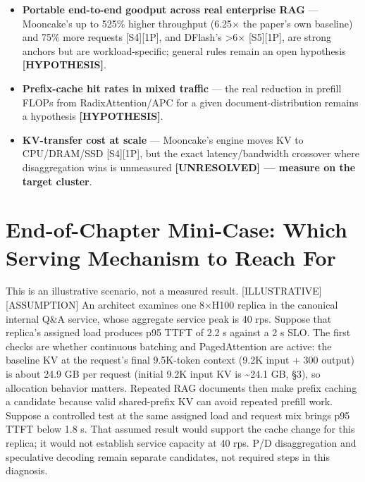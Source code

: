 \begin{itemize}
\tightlist
\item
  \textbf{Portable end-to-end goodput across real enterprise RAG} ---
  Mooncake's up to 525\% higher throughput (6.25× the paper's own
  baseline) and 75\% more requests \mbox{{[}S4{]}}\hspace{0pt}\mbox{{[}1P{]}}, and DFlash's
  \textgreater6× \mbox{{[}S5{]}}\hspace{0pt}\mbox{{[}1P{]}}, are strong anchors but are
  workload-specific; general rules remain an open hypothesis
  \textbf{\mbox{{[}HYPOTHESIS{]}}}.
\item
  \textbf{Prefix-cache hit rates in mixed traffic} --- the real
  reduction in prefill FLOPs from RadixAttention/APC for a given
  document-distribution remains a hypothesis \textbf{\mbox{{[}HYPOTHESIS{]}}}.
\item
  \textbf{KV-transfer cost at scale} --- Mooncake's engine moves KV to
  CPU/DRAM/SSD \mbox{{[}S4{]}}\hspace{0pt}\mbox{{[}1P{]}}, but the exact latency/bandwidth
  crossover where disaggregation wins is unmeasured
  \textbf{\mbox{{[}UNRESOLVED{]}} --- measure on the target cluster}.
\end{itemize}

\section{End-of-Chapter Mini-Case: Which Serving Mechanism to Reach
For}\label{end-of-chapter-mini-case-which-serving-mechanism-to-reach-for}

This is an illustrative scenario, not a measured result.
\mbox{{[}ILLUSTRATIVE{]}}\hspace{0pt}\mbox{{[}ASSUMPTION{]}} An architect examines one 8×H100
replica in the canonical internal Q\&A service, whose aggregate service
peak is 40 rps. Suppose that replica's assigned load produces p95 TTFT
of 2.2 s against a 2 s SLO. The first checks are whether continuous
batching and PagedAttention are active: the baseline KV at the request's
final 9.5K-token context (9.2K input + 300 output) is about 24.9 GB per
request (initial 9.2K input KV is \textasciitilde24.1 GB, §3), so
allocation behavior matters. Repeated RAG documents then make prefix
caching a candidate because valid shared-prefix KV can avoid repeated
prefill work. Suppose a controlled test at the same assigned load and
request mix brings p95 TTFT below 1.8 s. That assumed result would
support the cache change for this replica; it would not establish
service capacity at 40 rps. P/D disaggregation and speculative decoding
remain separate candidates, not required steps in this diagnosis.

